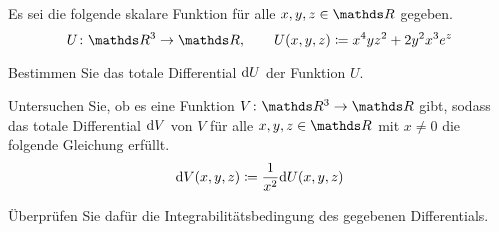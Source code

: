 \begin{atiTask}[
  title = Vollständiges Differential
]
  Es sei die folgende skalare Funktion für alle $x,y,z\in\setReal$ gegeben.
  \[
    \function{U}{\setReal^3}{\setReal}
    \separate
    U(x,y,z)\define x^4yz^2 + 2y^2x^3e^z
  \]
  \begin{atiSubtasks}
    \item{
      Bestimmen Sie das totale Differential $\mathrm{d} U$ der Funktion $U$.
    }
    \item{
      Untersuchen Sie, ob es eine Funktion $\function{V}{\setReal^3}{\setReal}$ gibt, sodass das totale Differential $\mathrm{d} V$ von $V$ für alle $x,y,z\in\setReal$ mit $x\neq 0$ die folgende Gleichung erfüllt.
      \[
        \mathrm{d} V(x,y,z)\coloneqq \frac{1}{x^2} \mathrm{d} U(x,y,z)
      \]
      \begin{atiNote}
        Überprüfen Sie dafür die Integrabilitätsbedingung des gegebenen Differentials.
      \end{atiNote}
    }
  \end{atiSubtasks}
\end{atiTask}
